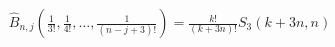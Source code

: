 \documentclass[a4paper, 12pt]{article}
\begin{document}
\begin{equation}
\begin{aligned}
    \hat{B}_{n, j}\left(\frac{1}{3!}, \frac{1}{4!}, \dots, \frac{1}{(n-j+3)!}\right) = \frac{k!}{(k+3n)!}S_{3}(k+3n, n)
\end{aligned}
\end{equation}
\end{document}
